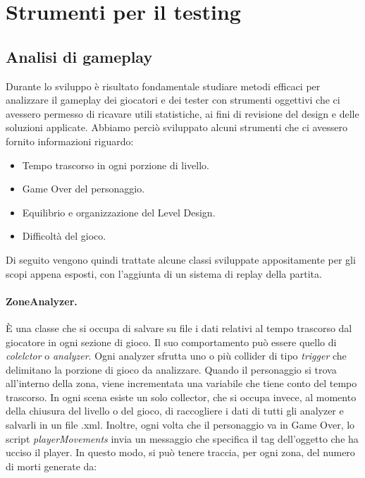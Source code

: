 \section{Strumenti per il testing}

\subsection{Analisi di gameplay}
\label{sec:analisi_gamplay}

Durante lo sviluppo è risultato fondamentale studiare metodi efficaci per analizzare il gameplay dei giocatori e dei tester con strumenti oggettivi che ci avessero permesso di ricavare utili statistiche, ai fini di revisione del design e delle soluzioni applicate.
Abbiamo perciò sviluppato alcuni strumenti che ci avessero fornito informazioni riguardo:

\begin{itemize}
	\item Tempo trascorso in ogni porzione di livello.
	\item Game Over del personaggio.
	\item Equilibrio e organizzazione del Level Design.
	\item Difficoltà del gioco.	
\end{itemize}

Di seguito vengono quindi trattate alcune classi sviluppate appositamente per gli scopi appena esposti, con l’aggiunta di un sistema di replay della partita.

\paragraph{ZoneAnalyzer.}
\label{par:zone_analyzer}
È una classe che si occupa di salvare su file i dati relativi al tempo trascorso dal giocatore in ogni sezione di gioco. Il suo comportamento può essere quello di \textit{colelctor} o \textit{analyzer}. Ogni analyzer sfrutta uno o più collider di tipo \textit{trigger} che delimitano la porzione di gioco da analizzare. Quando il personaggio si trova all’interno della zona, viene incrementata una variabile che tiene conto del tempo trascorso. In ogni scena esiste un solo collector, che si occupa invece, al momento della chiusura del livello o del gioco, di raccogliere i dati di tutti gli analyzer e salvarli in un file .xml. Inoltre, ogni volta che il personaggio va in Game Over, lo script \textit{playerMovements} invia un messaggio che specifica il tag dell’oggetto che ha ucciso il player. In questo modo, si può tenere traccia, per ogni zona, del numero di morti generate da:

